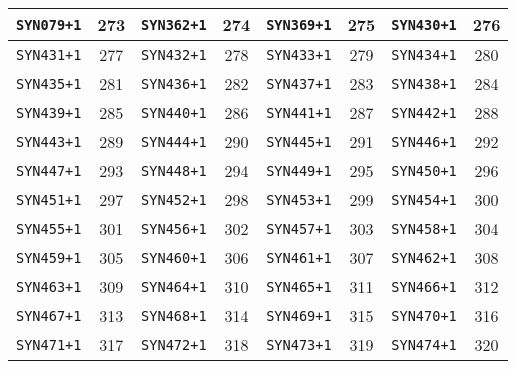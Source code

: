\begin{table}[H]
{\begin{tabular}{|c|c|c|c|c|c|c|c|}
\hline
\texttt{SYN079+1} & 273 & \texttt{SYN362+1} & 274 & \texttt{SYN369+1} & 275 & \texttt{SYN430+1} & 276\\
\hline
\texttt{SYN431+1} & 277 & \texttt{SYN432+1} & 278 & \texttt{SYN433+1} & 279 & \texttt{SYN434+1} & 280\\
\hline
\texttt{SYN435+1} & 281 & \texttt{SYN436+1} & 282 & \texttt{SYN437+1} & 283 & \texttt{SYN438+1} & 284\\
\hline
\texttt{SYN439+1} & 285 & \texttt{SYN440+1} & 286 & \texttt{SYN441+1} & 287 & \texttt{SYN442+1} & 288\\
\hline
\texttt{SYN443+1} & 289 & \texttt{SYN444+1} & 290 & \texttt{SYN445+1} & 291 & \texttt{SYN446+1} & 292\\
\hline
\texttt{SYN447+1} & 293 & \texttt{SYN448+1} & 294 & \texttt{SYN449+1} & 295 & \texttt{SYN450+1} & 296\\
\hline
\texttt{SYN451+1} & 297 & \texttt{SYN452+1} & 298 & \texttt{SYN453+1} & 299 & \texttt{SYN454+1} & 300\\
\hline
\texttt{SYN455+1} & 301 & \texttt{SYN456+1} & 302 & \texttt{SYN457+1} & 303 & \texttt{SYN458+1} & 304\\
\hline
\texttt{SYN459+1} & 305 & \texttt{SYN460+1} & 306 & \texttt{SYN461+1} & 307 & \texttt{SYN462+1} & 308\\
\hline
\texttt{SYN463+1} & 309 & \texttt{SYN464+1} & 310 & \texttt{SYN465+1} & 311 & \texttt{SYN466+1} & 312\\
\hline
\texttt{SYN467+1} & 313 & \texttt{SYN468+1} & 314 & \texttt{SYN469+1} & 315 & \texttt{SYN470+1} & 316\\
\hline
\texttt{SYN471+1} & 317 & \texttt{SYN472+1} & 318 & \texttt{SYN473+1} & 319 & \texttt{SYN474+1} & 320\\
\hline
\end{tabular}
}
\end{table}

